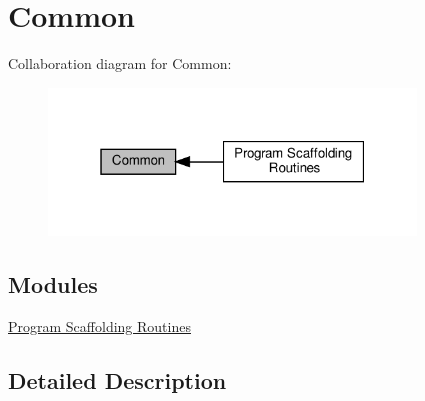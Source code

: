 \hypertarget{group__common}{}\section{Common}
\label{group__common}
Collaboration diagram for Common\+:
\nopagebreak
\begin{figure}[H]
\begin{center}
\leavevmode
\includegraphics[width=277pt]{group__common}
\end{center}
\end{figure}
\subsection*{Modules}
\begin{DoxyCompactItemize}
\item 
\hyperlink{group__scaffolding}{Program Scaffolding Routines}
\end{DoxyCompactItemize}


\subsection{Detailed Description}
